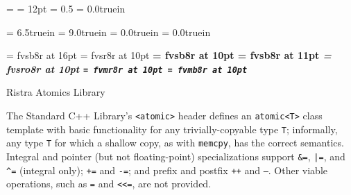 



\let\noarrow  = t
\let\nobibtex = t
\ifx\eplain\undefined  \fi

\magnification = 
\baselineskip  = 12pt
\parskip       = 0.5\baselineskip
\parindent     = 0.0truein

\raggedbottom
\leftdisplays
\nopagenumbers

\hsize   = 6.5truein
\vsize   = 9.0truein
\hoffset = 0.0truein
\voffset = 0.0truein




\font\hvbig = fvsb8r  at 16pt
\font\hv    = fvsr8r  at 10pt
\font\bf    = fvsb8r  at 10pt
\font\bfmed = fvsb8r  at 11pt
\font\it    = fvsro8r at 10pt
\font\tt    = fvmr8r  at 10pt
\font\ttbf  = fvmb8r  at 10pt
\hv



\def\section#1{\bigskip{\bfmed#1.}}




\centerline{\hvbig Ristra Atomics Library}
\medskip
\smallskip




\section{Background}
The Standard C++ Library's {\tt <atomic>} header defines an {\tt atomic<T>}
class template with basic functionality for any trivially-copyable type {\tt T};
informally, any type {\tt T} for which a shallow copy, as with {\tt memcpy},
has the correct semantics. Integral and pointer (but not floating-point)
specializations support {\tt \&=}, {\tt |=}, and {\tt \^{}=} (integral only);
{\tt +=} and {\tt -=}; and prefix and postfix {\tt ++} and {\tt --}. Other
viable operations, such as {\tt *=} and {\tt <<=}, are not provided.

